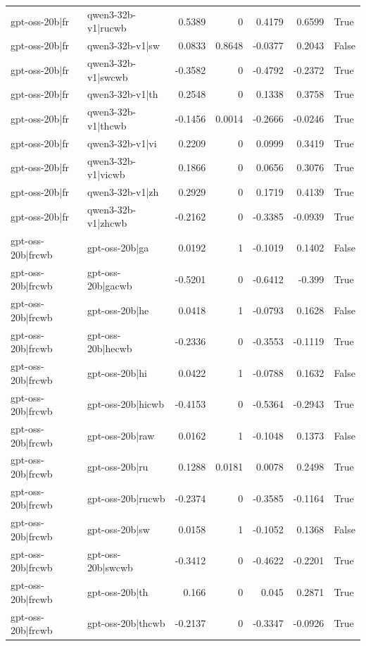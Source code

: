 \begin{table}
\begin{tabular}{l l r r r r l}
gpt-oss-20b|fr & qwen3-32b-v1|rucwb & 0.5389 & 0 & 0.4179 & 0.6599 & True \\
gpt-oss-20b|fr & qwen3-32b-v1|sw & 0.0833 & 0.8648 & -0.0377 & 0.2043 & False \\
gpt-oss-20b|fr & qwen3-32b-v1|swcwb & -0.3582 & 0 & -0.4792 & -0.2372 & True \\
gpt-oss-20b|fr & qwen3-32b-v1|th & 0.2548 & 0 & 0.1338 & 0.3758 & True \\
gpt-oss-20b|fr & qwen3-32b-v1|thcwb & -0.1456 & 0.0014 & -0.2666 & -0.0246 & True \\
gpt-oss-20b|fr & qwen3-32b-v1|vi & 0.2209 & 0 & 0.0999 & 0.3419 & True \\
gpt-oss-20b|fr & qwen3-32b-v1|vicwb & 0.1866 & 0 & 0.0656 & 0.3076 & True \\
gpt-oss-20b|fr & qwen3-32b-v1|zh & 0.2929 & 0 & 0.1719 & 0.4139 & True \\
gpt-oss-20b|fr & qwen3-32b-v1|zhcwb & -0.2162 & 0 & -0.3385 & -0.0939 & True \\
gpt-oss-20b|frcwb & gpt-oss-20b|ga & 0.0192 & 1 & -0.1019 & 0.1402 & False \\
gpt-oss-20b|frcwb & gpt-oss-20b|gacwb & -0.5201 & 0 & -0.6412 & -0.399 & True \\
gpt-oss-20b|frcwb & gpt-oss-20b|he & 0.0418 & 1 & -0.0793 & 0.1628 & False \\
gpt-oss-20b|frcwb & gpt-oss-20b|hecwb & -0.2336 & 0 & -0.3553 & -0.1119 & True \\
gpt-oss-20b|frcwb & gpt-oss-20b|hi & 0.0422 & 1 & -0.0788 & 0.1632 & False \\
gpt-oss-20b|frcwb & gpt-oss-20b|hicwb & -0.4153 & 0 & -0.5364 & -0.2943 & True \\
gpt-oss-20b|frcwb & gpt-oss-20b|raw & 0.0162 & 1 & -0.1048 & 0.1373 & False \\
gpt-oss-20b|frcwb & gpt-oss-20b|ru & 0.1288 & 0.0181 & 0.0078 & 0.2498 & True \\
gpt-oss-20b|frcwb & gpt-oss-20b|rucwb & -0.2374 & 0 & -0.3585 & -0.1164 & True \\
gpt-oss-20b|frcwb & gpt-oss-20b|sw & 0.0158 & 1 & -0.1052 & 0.1368 & False \\
gpt-oss-20b|frcwb & gpt-oss-20b|swcwb & -0.3412 & 0 & -0.4622 & -0.2201 & True \\
gpt-oss-20b|frcwb & gpt-oss-20b|th & 0.166 & 0 & 0.045 & 0.2871 & True \\
gpt-oss-20b|frcwb & gpt-oss-20b|thcwb & -0.2137 & 0 & -0.3347 & -0.0926 & True \\

\end{tabular}
\end{table}
